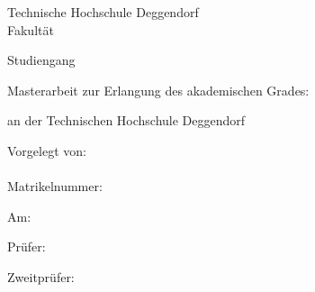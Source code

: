 \begin{titlepage}
\begin{center}
	{
	Technische Hochschule Deggendorf\\
	Fakultät \faculty\par}
	\vspace{.2cm}
{\Large Studiengang \studies\\}
\vspace{6\baselineskip}
{\Huge{}\thesistitleDE\par}
\vspace{1cm}
{\Huge{}\thesistitleEN\par}
\vspace{6\baselineskip}

Masterarbeit zur Erlangung des akademischen Grades:

	\vspace{.2cm}
	\emph{\degree}
	\vspace{.2cm}

an der Technischen Hochschule Deggendorf\\
\end{center}
\vfill
\parbox[t]{.4\textwidth}{
	Vorgelegt von:\\
	\student\\
	Matrikelnummer: \matrnr\par
	\vspace{\baselineskip}
	Am: \submissiondate\par
}
\hfill
\parbox[t]{.4\textwidth}{
Prüfer:\\
\supervisor%

\ifthenelse{\equal{\secsupervisor}{}}{}
{%
\vspace{\baselineskip}
Zweitprüfer:\\
\secsupervisor%
}}
\end{titlepage}
\cleardoublepage\par
